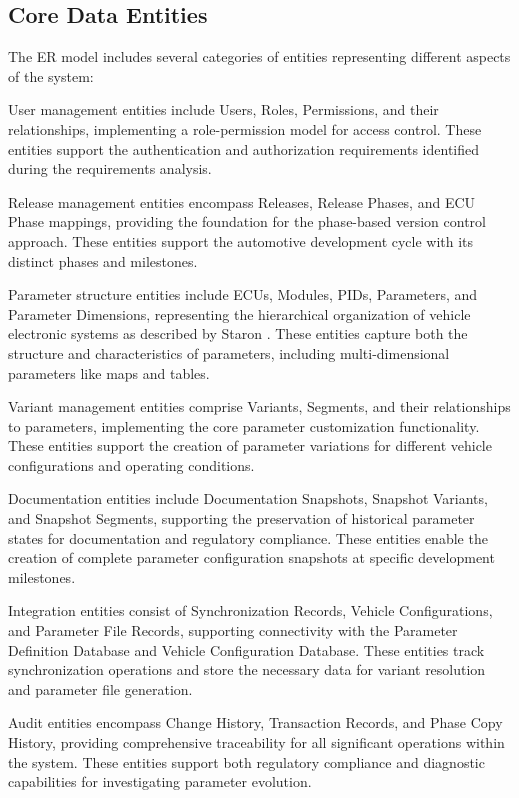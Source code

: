 \subsection{Core Data Entities}
\label{subsec:core-data-entities}

The ER model includes several categories of entities representing different aspects of the system:

User management entities include Users, Roles, Permissions, and their relationships, implementing a role-permission model for access control. These entities support the authentication and authorization requirements identified during the requirements analysis.

Release management entities encompass Releases, Release Phases, and ECU Phase mappings, providing the foundation for the phase-based version control approach. These entities support the automotive development cycle with its distinct phases and milestones.

Parameter structure entities include ECUs, Modules, PIDs, Parameters, and Parameter Dimensions, representing the hierarchical organization of vehicle electronic systems as described by Staron \cite{staron2021automotive}. These entities capture both the structure and characteristics of parameters, including multi-dimensional parameters like maps and tables.

Variant management entities comprise Variants, Segments, and their relationships to parameters, implementing the core parameter customization functionality. These entities support the creation of parameter variations for different vehicle configurations and operating conditions.

Documentation entities include Documentation Snapshots, Snapshot Variants, and Snapshot Segments, supporting the preservation of historical parameter states for documentation and regulatory compliance. These entities enable the creation of complete parameter configuration snapshots at specific development milestones.

Integration entities consist of Synchronization Records, Vehicle Configurations, and Parameter File Records, supporting connectivity with the Parameter Definition Database and Vehicle Configuration Database. These entities track synchronization operations and store the necessary data for variant resolution and parameter file generation.

Audit entities encompass Change History, Transaction Records, and Phase Copy History, providing comprehensive traceability for all significant operations within the system. These entities support both regulatory compliance and diagnostic capabilities for investigating parameter evolution.

